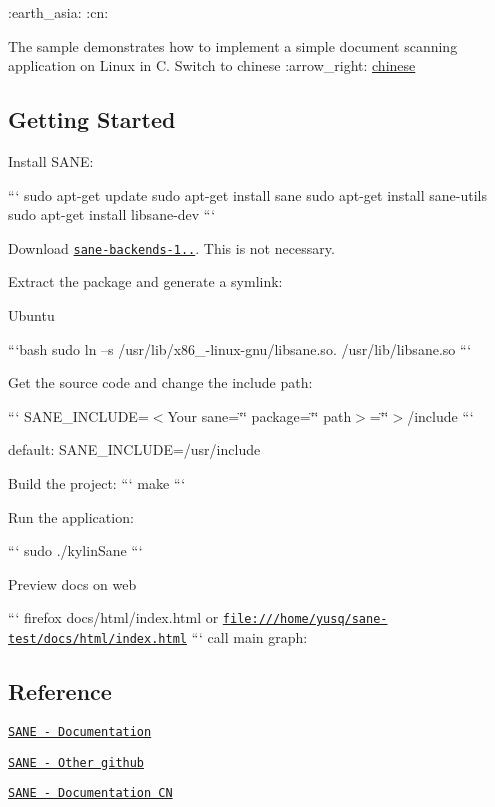 \+:earth\+\_\+asia\+: \+:cn\+:

The sample demonstrates how to implement a simple document scanning application on Linux in C. Switch to chinese \+:arrow\+\_\+right\+: \hyperlink{md_README_CN}{chinese}

\subsection*{Getting Started}


\begin{DoxyEnumerate}
\item Install S\+A\+NE\+:

``` sudo apt-\/get update sudo apt-\/get install sane sudo apt-\/get install sane-\/utils sudo apt-\/get install libsane-\/dev ```
\item Download \href{https://alioth.debian.org/frs/?group_id=30186}{\tt sane-\/backends-\/1..}. This is not necessary.
\item Extract the package and generate a symlink\+:

Ubuntu

```bash sudo ln –s /usr/lib/x86\+\_-\/linux-\/gnu/libsane.so. /usr/lib/libsane.so ```
\item Get the source code and change the include path\+:

``` S\+A\+N\+E\+\_\+\+I\+N\+C\+L\+U\+DE=$<$\+Your sane=\char`\"{}\char`\"{} package=\char`\"{}\char`\"{} path$>$=\char`\"{}\char`\"{}$>$/include ```

default\+: S\+A\+N\+E\+\_\+\+I\+N\+C\+L\+U\+DE=/usr/include
\item Build the project\+: ``` make ```
\item Run the application\+:

``` sudo ./kylin\+Sane ```
\item Preview docs on web

``` firefox docs/html/index.\+html or \href{file:///home/yusq/sane-test/docs/html/index.html}{\tt file\+:///home/yusq/sane-\/test/docs/html/index.\+html} ``` call main graph\+: 
\end{DoxyEnumerate}

\subsection*{Reference}


\begin{DoxyItemize}
\item \href{http://www.sane-project.org/docs.html}{\tt S\+A\+NE -\/ Documentation}
\item \href{https://github.com/yushulx/linux-document-scanning}{\tt S\+A\+NE -\/ Other github}
\item \href{https://blog.csdn.net/weixin_39743893/article/details/83350568}{\tt S\+A\+NE -\/ Documentation CN} 
\end{DoxyItemize}